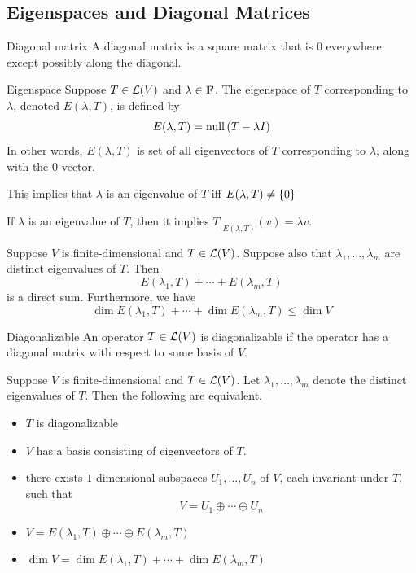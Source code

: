 \documentclass[12pt,a4paper]{article}
\begin{document}
    \subsection{Eigenspaces and Diagonal Matrices}
    \begin{defi}{Diagonal matrix}
        A diagonal matrix is a square matrix that is $0$ everywhere except possibly along the diagonal.
    \end{defi}
    \hfill

    \begin{defi}{Eigenspace}%
        Suppose $T\in\mathcal{L}(V)$ and $\lambda\in\mathbf{F}$. The eigenspace of $T$ corresponding to $\lambda$, denoted $E(\lambda,T)$, is defined by 
        $$
        E(\lambda,T)=\operatorname{null\,}(T-\lambda I)
        $$In other words, $E(\lambda,T)$ is set of all eigenvectors of $T$ corresponding to $\lambda$, along with the $0$ vector.
    \end{defi}
    \begin{remark}
        This implies that $\lambda$ is an eigenvalue of $T$ iff $E(\lambda,T)\neq\left\{0\right\}$
    \end{remark}
    \begin{remark}
        If $\lambda$ is an eigenvalue of $T$, then it implies $T|_{E(\lambda,T)}(v)=\lambda v$.
    \end{remark}
    \hfill

    \begin{prop}
        Suppose $V$ is finite-dimensional and $T\in\mathcal{L}(V)$. Suppose also that $\lambda_1,\dots,\lambda_m$ are distinct eigenvalues of $T$. Then
        $$
        E(\lambda_1,T)+\cdots+E(\lambda_m,T)
        $$
        is a direct sum. Furthermore, we have
        $$
        \dim E(\lambda_1,T)+\cdots+\dim E(\lambda_m,T)\leq \dim V
        $$
    \end{prop}
    \hfill

    \begin{defi}{Diagonalizable}\label{5.35}
        An operator $T\in\mathcal{L}(V)$ is diagonalizable if the operator has a diagonal matrix with respect to some basis of $V$.
    \end{defi}
    \hfill

    \begin{prop}
        Suppose $V$ is finite-dimensional and $T\in\mathcal{L}(V)$. Let $\lambda_1,\dots,\lambda_m$ denote the distinct eigenvalues of $T$. Then the following are equivalent.
        \begin{itemize}
            \item $T$ is diagonalizable
            \item $V$ has a basis consisting of eigenvectors of $T$.
            \item there exists $1$-dimensional subspaces $U_1,\dots,U_n$ of $V$, each invariant under $T$, such that
            $$
            V=U_1\oplus\cdots\oplus U_n
            $$
            \item $V=E(\lambda_1,T)\oplus\cdots\oplus E(\lambda_m,T)$
            \item $\dim V=\dim E(\lambda_1,T)+\cdots+\dim E(\lambda_m,T)$
        \end{itemize}
    \end{prop}
    \hfill
\end{document}
